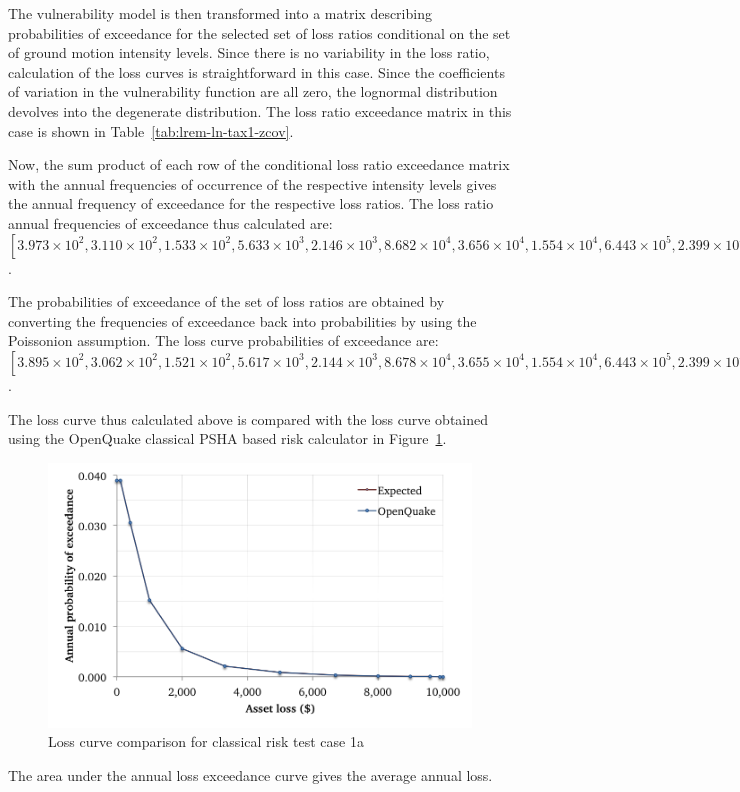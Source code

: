 The vulnerability model is then transformed into a matrix describing probabilities of exceedance for the selected set of loss ratios conditional on the set of ground motion intensity levels. Since there is no variability in the loss ratio, calculation of the loss curves is straightforward in this case. Since the coefficients of variation in the vulnerability function are all zero, the lognormal distribution devolves into the degenerate distribution. The loss ratio exceedance matrix in this case is shown in Table~\ref{tab:lrem-ln-tax1-zcov}.



Now, the sum product of each row of the conditional loss ratio exceedance matrix with the annual frequencies of occurrence of the respective intensity levels gives the annual frequency of exceedance for the respective loss ratios. The loss ratio annual frequencies of exceedance thus calculated are: $[3.973\times10^{2}, 3.110\times10^{2}, 1.533\times10^{2}, 5.633\times10^{3}, 2.146\times10^{3}, 8.682\times10^{4}, 3.656\times10^{4}, 1.554\times10^{4}, 6.443\times10^{5}, 2.399\times10^{5}]$.

The probabilities of exceedance of the set of loss ratios are obtained by converting the frequencies of exceedance back into probabilities by using the Poissonion assumption. The loss curve probabilities of exceedance are: $[3.895\times10^{2}, 3.062\times10^{2}, 1.521\times10^{2}, 5.617\times10^{3}, 2.144\times10^{3}, 8.678\times10^{4}, 3.655\times10^{4}, 1.554\times10^{4}, 6.443\times10^{5}, 2.399\times10^{5}, 5.683\times10^{6}]$.

The loss curve thus calculated above is compared with the loss curve obtained using the OpenQuake classical PSHA based risk calculator in Figure~\ref{fig:lc-cr-1a}.

\begin{figure}[htbp]
\centering
\includegraphics[width=12cm]{qareport/figures/fig-lc-cr-1a}
\caption{Loss curve comparison for classical risk test case 1a}
\label{fig:lc-cr-1a}
\end{figure}

The area under the annual loss exceedance curve gives the average annual loss.
